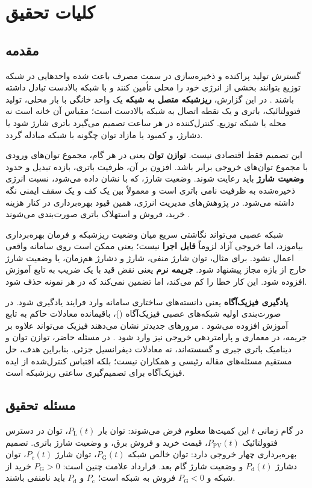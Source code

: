 \chapter{کلیات تحقیق}
\label{chap:introduction}

\section{مقدمه}
گسترش تولید پراکنده و ذخیره‌سازی در سمت مصرف باعث شده واحدهایی در شبکه توزیع بتوانند بخشی از انرژی خود را محلی تأمین کنند و با شبکه بالادست تبادل داشته باشند . در این گزارش، \textbf{ریزشبکه متصل به شبکه} یک واحد خانگی با بار محلی، تولید فتوولتائیک، باتری و یک نقطه اتصال به شبکه بالادست است؛ مقیاس آن خانه است نه محله یا شبکه توزیع. کنترل‌کننده در هر ساعت تصمیم می‌گیرد باتری شارژ شود یا دشارژ، و کمبود یا مازاد توان چگونه با شبکه مبادله گردد.

این تصمیم فقط اقتصادی نیست. \textbf{توازن توان} یعنی در هر گام، مجموع توان‌های ورودی با مجموع توان‌های خروجی برابر باشد. افزون بر آن، ظرفیت باتری، بازده تبدیل و حدود \textbf{وضعیت شارژ} باید رعایت شوند. وضعیت شارژ، که با  نشان داده می‌شود، نسبت انرژی ذخیره‌شده به ظرفیت نامی باتری است و معمولاً بین یک کف و یک سقف ایمنی نگه داشته می‌شود. در پژوهش‌های مدیریت انرژی، همین قیود بهره‌برداری در کنار هزینه خرید، فروش و استهلاک باتری صورت‌بندی می‌شوند .

شبکه عصبی می‌تواند نگاشتی سریع میان وضعیت ریزشبکه و فرمان بهره‌برداری بیاموزد، اما خروجی آزاد لزوماً \textbf{قابل اجرا} نیست؛ یعنی ممکن است روی سامانه واقعی اعمال نشود. برای مثال، توان شارژ منفی، شارژ و دشارژ هم‌زمان، یا وضعیت شارژ خارج از بازه مجاز پیشنهاد شود. \textbf{جریمه نرم} یعنی نقض قید با یک ضریب به تابع آموزش افزوده شود. این کار خطا را کم می‌کند، اما تضمین نمی‌کند که در هر نمونه حذف شود.

\textbf{یادگیری فیزیک‌آگاه} یعنی دانسته‌های ساختاری سامانه وارد فرایند یادگیری شود. در صورت‌بندی اولیه شبکه‌های عصبی فیزیک‌آگاه ()، باقیمانده معادلات حاکم به تابع آموزش افزوده می‌شود . مرورهای جدیدتر نشان می‌دهند فیزیک می‌تواند علاوه بر جریمه، در معماری و پارامتردهی خروجی نیز وارد شود . در مسئله حاضر، توازن توان و دینامیک باتری جبری و گسسته‌اند، نه معادلات دیفرانسیل جزئی. بنابراین هدف، حل مستقیم مسئله‌های مقاله رئیسی و همکاران نیست؛ بلکه اقتباس کنترل‌شده از ایده فیزیک‌آگاه برای تصمیم‌گیری ساعتی ریزشبکه است.

\section{مسئله تحقیق}
در گام زمانی $t$ این کمیت‌ها معلوم فرض می‌شوند: توان بار $P_{\mathrm{L}}(t)$، توان در دسترس فتوولتائیک $P_{\mathrm{PV}}(t)$، قیمت خرید و فروش برق، و وضعیت شارژ باتری. تصمیم بهره‌برداری چهار خروجی دارد: توان خالص شبکه $P_{\mathrm{G}}(t)$، توان شارژ $P_{\mathrm{c}}(t)$، توان دشارژ $P_{\mathrm{d}}(t)$ و وضعیت شارژ گام بعد. قرارداد علامت چنین است: $P_{\mathrm{G}}>0$ خرید از شبکه و $P_{\mathrm{G}}<0$ فروش به شبکه است؛ $P_{\mathrm{c}}$ و $P_{\mathrm{d}}$ باید نامنفی باشند.

